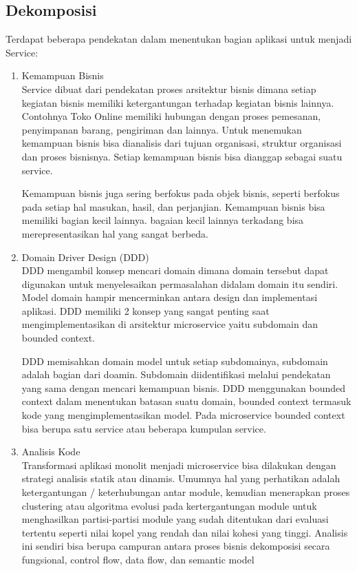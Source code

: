 \subsection{Dekomposisi}
Terdapat beberapa pendekatan dalam menentukan bagian aplikasi untuk menjadi Service:
\begin{enumerate}[leftmargin=1.3cm]
	\item Kemampuan Bisnis\cite{1C7}\\
		 Service dibuat dari pendekatan proses arsitektur bisnis dimana setiap kegiatan bisnis memiliki ketergantungan terhadap kegiatan bisnis lainnya. Contohnya Toko Online memiliki hubungan dengan proses pemesanan, penyimpanan barang, pengiriman dan lainnya. Untuk menemukan kemampuan bisnis bisa dianalisis dari tujuan organisasi, struktur organisasi dan proses bisnisnya. Setiap kemampuan bisnis bisa dianggap sebagai suatu service.

		 Kemampuan bisnis juga sering berfokus pada objek bisnis, seperti berfokus pada  setiap hal masukan, hasil, dan perjanjian. Kemampuan bisnis bisa memiliki bagian kecil lainnya. bagaian kecil lainnya terkadang bisa merepresentasikan hal yang sangat berbeda.
	\item Domain Driver Design (DDD) \cite{1C7} \\
		DDD mengambil konsep mencari domain dimana domain tersebut dapat digunakan untuk menyelesaikan permasalahan didalam domain itu sendiri. Model domain hampir mencerminkan antara design dan implementasi aplikasi. DDD memiliki 2 konsep yang sangat penting saat mengimplementasikan di arsitektur microservice yaitu subdomain dan bounded context.

		DDD memisahkan domain model untuk setiap subdomainya, subdomain adalah bagian dari doamin. Subdomain diidentifikasi melalui pendekatan yang sama dengan mencari kemampuan bisnis. DDD menggunakan bounded context dalam menentukan batasan suatu domain, bounded context termasuk kode yang mengimplementasikan model. Pada microservice bounded context bisa berupa satu service atau beberapa kumpulan service.
	\item Analisis Kode \cite{74C,5B1}  \\
		Transformasi aplikasi monolit menjadi microservice bisa dilakukan dengan strategi analisis statik atau dinamis. Umumnya hal yang perhatikan adalah ketergantungan / keterhubungan antar module, kemudian menerapkan proses clustering atau algoritma evolusi pada kertergantungan module untuk menghasilkan partisi-partisi module yang sudah ditentukan dari evaluasi tertentu seperti nilai kopel yang rendah dan nilai kohesi yang tinggi. Analisis ini sendiri bisa berupa campuran antara proses bisnis dekomposisi secara fungsional, control flow, data flow, dan semantic model
		
\end{enumerate}	


